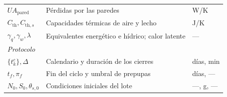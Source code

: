 \begin{table}[H]
\begin{tabular}{lll}
    $UA_{\mathrm{pared}}$ & Pérdidas por las paredes & W/K \\
    $C_{\mathrm{th}}, C_{\mathrm{th},s}$ & Capacidades térmicas de aire y lecho & J/K \\
    $\gamma_q, \gamma_w, \lambda$ & Equivalentes energético e hídrico; calor latente & --- \\
    \multicolumn{3}{l}{\emph{Protocolo}} \\
    $\{t_k^c\}, \Delta$ & Calendario y duración de los cierres & días, min \\
    $t_f, \pi_f$ & Fin del ciclo y umbral de prepupas & días, --- \\
    $N_0, S_0, \theta_{s,0}$ & Condiciones iniciales del lote & ---, g, --- \\
    \hline
  \end{tabular}
\end{table}
